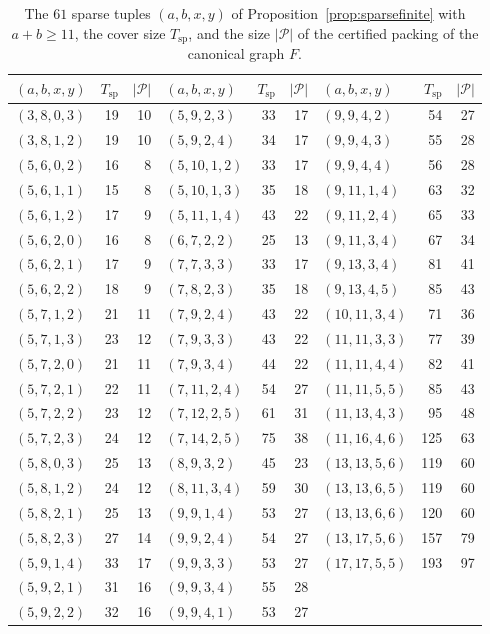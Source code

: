 \documentclass{amsart}
\theoremstyle{definition}
\theoremstyle{remark}
\numberwithin{equation}{section}
\numberwithin{table}{section}
\begin{document}
\begin{table}[p]
\caption{The $61$ sparse tuples $(a,b,x,y)$ of Proposition~\ref{prop:sparsefinite} with $a+b\ge11$, the cover size $T_{\mathrm{sp}}$, and the size $|\mathcal P|$ of the certified packing of the canonical graph $F$.}\label{tab:sparsecert}
\small
\renewcommand{\arraystretch}{1.05}
\begin{tabular}{@{}lrr@{\qquad}lrr@{\qquad}lrr@{}}
\toprule
$(a,b,x,y)$ & $T_{\mathrm{sp}}$ & $|\mathcal P|$ & $(a,b,x,y)$ & $T_{\mathrm{sp}}$ & $|\mathcal P|$ & $(a,b,x,y)$ & $T_{\mathrm{sp}}$ & $|\mathcal P|$\\
\midrule
$(3,8,0,3)$ & 19 & 10 & $(5,9,2,3)$ & 33 & 17 & $(9,9,4,2)$ & 54 & 27 \\
$(3,8,1,2)$ & 19 & 10 & $(5,9,2,4)$ & 34 & 17 & $(9,9,4,3)$ & 55 & 28 \\
$(5,6,0,2)$ & 16 & 8 & $(5,10,1,2)$ & 33 & 17 & $(9,9,4,4)$ & 56 & 28 \\
$(5,6,1,1)$ & 15 & 8 & $(5,10,1,3)$ & 35 & 18 & $(9,11,1,4)$ & 63 & 32 \\
$(5,6,1,2)$ & 17 & 9 & $(5,11,1,4)$ & 43 & 22 & $(9,11,2,4)$ & 65 & 33 \\
$(5,6,2,0)$ & 16 & 8 & $(6,7,2,2)$ & 25 & 13 & $(9,11,3,4)$ & 67 & 34 \\
$(5,6,2,1)$ & 17 & 9 & $(7,7,3,3)$ & 33 & 17 & $(9,13,3,4)$ & 81 & 41 \\
$(5,6,2,2)$ & 18 & 9 & $(7,8,2,3)$ & 35 & 18 & $(9,13,4,5)$ & 85 & 43 \\
$(5,7,1,2)$ & 21 & 11 & $(7,9,2,4)$ & 43 & 22 & $(10,11,3,4)$ & 71 & 36 \\
$(5,7,1,3)$ & 23 & 12 & $(7,9,3,3)$ & 43 & 22 & $(11,11,3,3)$ & 77 & 39 \\
$(5,7,2,0)$ & 21 & 11 & $(7,9,3,4)$ & 44 & 22 & $(11,11,4,4)$ & 82 & 41 \\
$(5,7,2,1)$ & 22 & 11 & $(7,11,2,4)$ & 54 & 27 & $(11,11,5,5)$ & 85 & 43 \\
$(5,7,2,2)$ & 23 & 12 & $(7,12,2,5)$ & 61 & 31 & $(11,13,4,3)$ & 95 & 48 \\
$(5,7,2,3)$ & 24 & 12 & $(7,14,2,5)$ & 75 & 38 & $(11,16,4,6)$ & 125 & 63 \\
$(5,8,0,3)$ & 25 & 13 & $(8,9,3,2)$ & 45 & 23 & $(13,13,5,6)$ & 119 & 60 \\
$(5,8,1,2)$ & 24 & 12 & $(8,11,3,4)$ & 59 & 30 & $(13,13,6,5)$ & 119 & 60 \\
$(5,8,2,1)$ & 25 & 13 & $(9,9,1,4)$ & 53 & 27 & $(13,13,6,6)$ & 120 & 60 \\
$(5,8,2,3)$ & 27 & 14 & $(9,9,2,4)$ & 54 & 27 & $(13,17,5,6)$ & 157 & 79 \\
$(5,9,1,4)$ & 33 & 17 & $(9,9,3,3)$ & 53 & 27 & $(17,17,5,5)$ & 193 & 97 \\
$(5,9,2,1)$ & 31 & 16 & $(9,9,3,4)$ & 55 & 28 & & & \\
$(5,9,2,2)$ & 32 & 16 & $(9,9,4,1)$ & 53 & 27 & & & \\
\bottomrule
\end{tabular}


\end{table}
\end{document}

